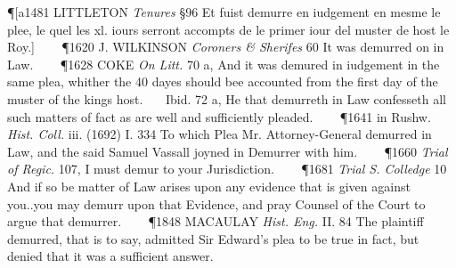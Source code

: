 \begin{description}[wide, labelwidth=!, labelindent=0pt]
\begin{myenumerate}
\P [a1481 LITTLETON  \textit{Tenures} §96 Et fuist demurre en iudgement en mesme le plee, le quel les xl. iours serront accompts de le primer iour del muster de host le Roy.]    
\P 1620 J. WILKINSON  \textit{Coroners \& Sherifes} 60 It was demurred on in Law.    
\P 1628 COKE  \textit{On Litt.} 70 a, And it was demured in iudgement in the same plea, whither the 40 dayes should bee accounted from the first day of the muster of the kings host.    Ibid. 72 a, He that demurreth in Law confesseth all such matters of fact as are well and sufficiently pleaded.    
\P 1641 in  Rushw. \textit{Hist. Coll.} iii. (1692) I. 334 To which Plea Mr. Attorney-General demurred in Law, and the said Samuel Vassall joyned in Demurrer with him.    
\P 1660  \textit{Trial of Regic.} 107, I must demur to your Jurisdiction.    
\P 1681  \textit{Trial S. Colledge} 10 And if so be matter of Law arises upon any evidence that is given against you..you may demurr upon that Evidence, and pray Counsel of the Court to argue that demurrer.    
\P 1848 MACAULAY  \textit{Hist. Eng.} II. 84 The plaintiff demurred, that is to say, admitted Sir Edward's plea to be true in fact, but denied that it was a sufficient answer.
\end{myenumerate}



\end{description}
